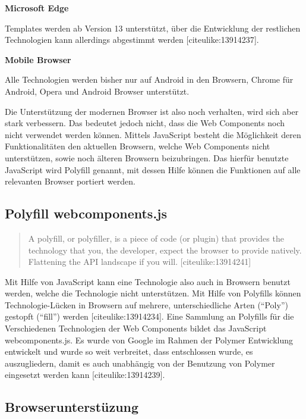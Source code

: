 \textbf{Microsoft Edge}

Templates werden ab Version 13 unterstützt, über die Entwicklung der
restlichen Technologien kann allerdings abgestimmt werden
{[}citeulike:13914237{]}.

\textbf{Mobile Browser}

Alle Technologien werden bisher nur auf Android in den Browsern, Chrome
für Android, Opera und Android Browser unterstützt.

Die Unterstützung der modernen Browser ist also noch verhalten, wird
sich aber stark verbessern. Das bedeutet jedoch nicht, dass die Web
Components noch nicht verwendet werden können. Mittels JavaScript
besteht die Möglichkeit deren Funktionalitäten den aktuellen Browsern,
welche Web Components nicht unterstützen, sowie noch älteren Browsern
beizubringen. Das hierfür benutzte JavaScript wird Polyfill genannt, mit
dessen Hilfe können die Funktionen auf alle relevanten Browser portiert
werden.

\subsection{Polyfill webcomponents.js}\label{polyfill-webcomponents.js}

\begin{quote}
A polyfill, or polyfiller, is a piece of code (or plugin) that provides
the technology that you, the developer, expect the browser to provide
natively. Flattening the API landscape if you will.
{[}citeulike:13914241{]}
\end{quote}

Mit Hilfe von JavaScript kann eine Technologie also auch in Browsern
benutzt werden, welche die Technologie nicht unterstützen. Mit Hilfe von
Polyfills können Technologie-Lücken in Browsern auf mehrere,
unterschiedliche Arten (``Poly'') gestopft (``fill'') werden
{[}citeulike:13914234{]}. Eine Sammlung an Polyfills für die
Verschiedenen Technologien der Web Components bildet das JavaScript
webcomponents.js. Es wurde von Google im Rahmen der Polymer Entwicklung
entwickelt und wurde so weit verbreitet, dass entschlossen wurde, es
auszugliedern, damit es auch unabhängig von der Benutzung von Polymer
eingesetzt werden kann {[}citeulike:13914239{]}.

\subsection{Browserunterstüzung}\label{browserunterstuxfczung}

